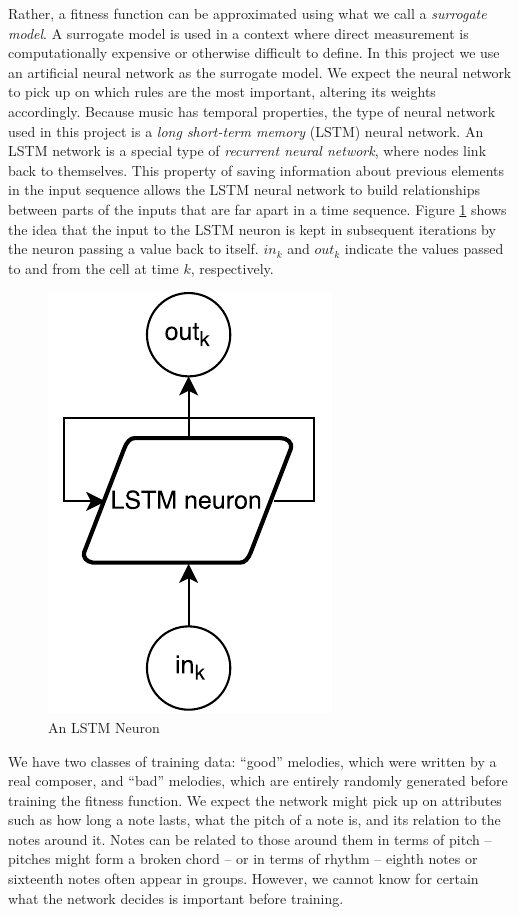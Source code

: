 Rather, a fitness function can be approximated using what we call a \textit{surrogate model}.
A surrogate model is used in a context where direct measurement is computationally expensive or otherwise difficult to define.
In this project we use an artificial neural network as the surrogate model.
We expect the neural network to pick up on which rules are the most important, altering its weights accordingly.
Because music has temporal properties, the type of neural network used in this project is a \textit{long short-term memory} (LSTM) neural network.
An LSTM network is a special type of \textit{recurrent neural network}, where nodes link back to themselves.
This property of saving information about previous elements in the input sequence allows the LSTM neural network to build relationships between parts of the inputs that are far apart in a time sequence.
Figure \ref{fig:lstm_cell} shows the idea that the input to the LSTM neuron is kept in subsequent iterations by the neuron passing a value back to itself.
$in_k$ and $out_k$ indicate the values passed to and from the cell at time $k$, respectively.

\begin{figure}[h]
	\centering
	\includegraphics{figures/lstm_cell.pdf}
	\caption{An LSTM Neuron}
	\label{fig:lstm_cell}
\end{figure}

We have two classes of training data: ``good'' melodies, which were written by a real composer, and ``bad'' melodies, which are entirely randomly generated before training the fitness function.
We expect the network might pick up on attributes such as how long a note lasts, what the pitch of a note is, and its relation to the notes around it.
Notes can be related to those around them in terms of pitch -- pitches might form a broken chord -- or in terms of rhythm -- eighth notes or sixteenth notes often appear in groups.
However, we cannot know for certain what the network decides is important before training.

